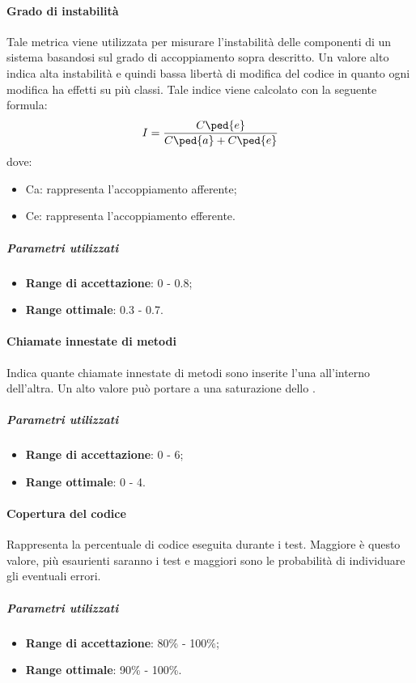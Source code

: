 \documentclass[../PianoDiQualifica.tex]{subfiles}
\begin{document}
				\paragraph{Grado di instabilità\\}
					Tale metrica viene utilizzata per misurare l'instabilità delle
					componenti di un sistema basandosi sul grado di accoppiamento sopra
					descritto. Un valore alto indica alta instabilità e quindi bassa
					libertà di modifica del codice in quanto ogni modifica ha effetti
					su più classi. Tale indice viene calcolato con la seguente formula:
					\begin{equation*}
						I=\frac{C \ped{e} }{C \ped{a}  +C \ped{e} }
					\end{equation*}
					dove:
					\begin{itemize}
						\item C\ped a: rappresenta l'accoppiamento afferente;
						\item C\ped e: rappresenta l'accoppiamento efferente.
					\end{itemize}
					\subparagraph{Parametri utilizzati}
						\begin{itemize}
							\item \textbf{Range di accettazione}: 0 - 0.8;
							\item \textbf{Range ottimale}: 0.3 - 0.7.
						\end{itemize}
				\paragraph{Chiamate innestate di metodi\\}
					Indica quante chiamate innestate di metodi sono inserite l'una
					all'interno dell'altra. Un alto valore può portare a una saturazione
					dello .
					\subparagraph{Parametri utilizzati}
						\begin{itemize}
							\item \textbf{Range di accettazione}: 0 - 6;
							\item \textbf{Range ottimale}: 0 - 4.
						\end{itemize}
				\paragraph{Copertura del codice\\}
					Rappresenta la percentuale di codice eseguita durante i test.
					Maggiore è questo valore, più esaurienti saranno i test e maggiori
					sono le probabilità di individuare gli eventuali errori.
					\subparagraph{Parametri utilizzati}
						\begin{itemize}
							\item \textbf{Range di accettazione}: 80\% - 100\%;
							\item \textbf{Range ottimale}: 90\% - 100\%.
						\end{itemize}
\end{document}
